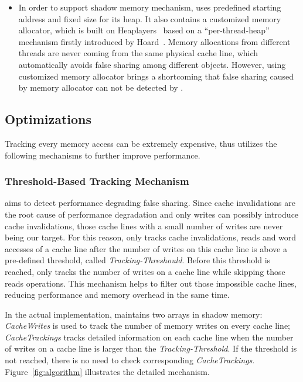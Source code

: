 \begin{itemize}
\item
In order to support shadow memory mechanism, \Predator{} uses predefined starting address and 
fixed size for its heap. 
It also contains a customized memory allocator, which is built on 
Heaplayers~\cite{heaplayers} based on a ``per-thread-heap'' mechanism firstly introduced 
by Hoard~\cite{Hoard}. 
Memory allocations from different threads are never coming 
from the same physical cache line, which automatically avoids false sharing among different objects. 
However, using customized memory allocator 
brings a shortcoming that false sharing caused by memory 
allocator can not be detected by \Predator{}. 

\end{itemize} 
 
\subsection{Optimizations}
\label{optimization}
Tracking every memory access can be extremely expensive, thus 
\Predator{} utilizes the following mechanisms to further improve performance.

\subsubsection{Threshold-Based Tracking Mechanism}
\label{sec:thresholdtracking}
\Predator{} aims to detect performance degrading false sharing.
Since cache invalidations are the root cause of performance degradation and only writes 
can possibly introduce cache invalidations, 
those cache lines with a small number of writes are never being our target.
For this reason, \Predator{} only tracks cache invalidations, reads and word accesses 
of a cache line after the number of writes on this cache line is above a
pre-defined threshold, called {\it Tracking-Threshould}. 
Before this threshold is reached, \Predator{} only tracks the number of writes on a cache line 
while skipping those reads operations. 
This mechanism helps to filter out
those impossible cache lines, reducing performance and memory overhead
in the same time.

In the actual implementation, \Predator{} maintains two arrays in shadow memory: 
{\it CacheWrites} is used to track the number of memory writes on every cache line;
{\it CacheTrackings} tracks detailed information 
on each cache line when the number of writes on a cache line is larger than
the {\it Tracking-Threshold}. 
If the threshold is not reached, there is no need to check corresponding {\it CacheTrackings}. 
Figure~\ref{fig:algorithm} illustrates the detailed mechanism.

